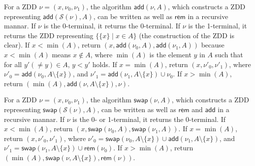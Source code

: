 \documentclass{article}
\begin{document}
For a ZDD $\nu = (x, \nu_0, \nu_1)$,
the algorithm $\mathsf{add}(\nu, A)$, which constructs a ZDD representing $\mathsf{add}(\mathcal{S}(\nu), A)$,
can be written as well as $\mathsf{rem}$ in a recursive mannar.
If $\nu$ is the 0-terminal, it returns the 0-terminal.
If $\nu$ is the 1-terminal, it returns the ZDD representing $\{\{x\} \mid x \in A\}$
(the construction of the ZDD is clear).
If $x < \min(A)$, return $(x, \mathsf{add}(\nu_0, A), \mathsf{add}(\nu_1, A))$
because $x < \min(A)$ means $x \notin A$,
where $\min(A)$ is the element $y$ in $A$ such that for all $y' (\neq y) \in A$, $y < y'$ holds. 
If $x = \min(A)$, return $(x, \nu'_0, \nu'_1)$,
where $\nu'_0 = \mathsf{add}(\nu_0, A \setminus \{x\})$,
and $\nu'_1 = \mathsf{add}(\nu_1, A \setminus \{x\}) \cup \nu_0$.
If $x > \min(A)$, return $(\min(A), \mathsf{add}(\nu, A \setminus \{x\}), \nu)$.

For a ZDD $\nu = (x, \nu_0, \nu_1)$,
the algorithm $\mathsf{swap}(\nu, A)$, which constructs a ZDD representing $\mathsf{swap}(\mathcal{S}(\nu), A)$,
can be written as well as $\mathsf{rem}$ and $\mathsf{add}$ in a recursive mannar.
If $\nu$ is the 0- or 1-terminal, it returns the 0-terminal.
If $x < \min(A)$, return $(x, \mathsf{swap}(\nu_0, A), \mathsf{swap}(\nu_1, A))$.
If $x = \min(A)$, return $(x, \nu'_0, \nu'_1)$,
where $\nu'_0 = \mathsf{swap}(\nu_0, A \setminus \{x\}) \cup \mathsf{add}(\nu_1, A \setminus \{x\})$,
and $\nu'_1 = \mathsf{swap}(\nu_1, A \setminus \{x\}) \cup \mathsf{rem}(\nu_0)$.
If $x > \min(A)$, return $(\min(A), \mathsf{swap}(\nu, A \setminus \{x\}), \mathsf{rem}(\nu))$.

\end{document}
